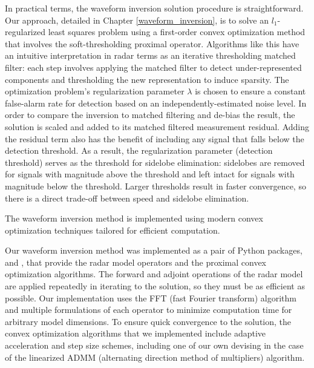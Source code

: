 In practical terms, the waveform inversion solution procedure is straightforward. Our approach, detailed in Chapter \ref{waveform_inversion}, is to solve an $l_1$-regularized least squares problem using a first-order convex optimization method that involves the soft-thresholding proximal operator. Algorithms like this have an intuitive interpretation in radar terms as an iterative thresholding matched filter: each step involves applying the matched filter to detect under-represented components and thresholding the new representation to induce sparsity. The optimization problem's regularization parameter $\lambda$ is chosen to ensure a constant false-alarm rate for detection based on an independently-estimated noise level. In order to compare the inversion to matched filtering and de-bias the result, the solution is scaled and added to its matched filtered measurement residual. Adding the residual term also has the benefit of including any signal that falls below the detection threshold. As a result, the regularization parameter (detection threshold) serves as the threshold for sidelobe elimination: sidelobes are removed for signals with magnitude above the threshold and left intact for signals with magnitude below the threshold. Larger thresholds result in faster convergence, so there is a direct trade-off between speed and sidelobe elimination.

\begin{italicquote}
 The waveform inversion method is implemented using modern convex optimization techniques tailored for efficient computation.
\end{italicquote}

Our waveform inversion method was implemented as a pair of Python packages,  and , that provide the radar model operators and the proximal convex optimization algorithms. The forward and adjoint operations of the radar model are applied repeatedly in iterating to the solution, so they must be as efficient as possible. Our implementation uses the FFT (fast Fourier transform) algorithm and multiple formulations of each operator to minimize computation time for arbitrary model dimensions. To ensure quick convergence to the solution, the convex optimization algorithms that we implemented include adaptive acceleration and step size schemes, including one of our own devising in the case of the linearized ADMM (alternating direction method of multipliers) algorithm.


